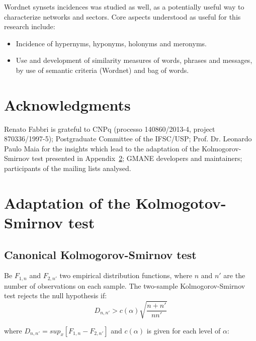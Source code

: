 \documentclass[%
 aip,
 jmp,%
 amsmath,amssymb,
 reprint,%
]{revtex4-1}
\begin{document}
Wordnet synsets incidences was studied as well, as a potentially useful way to characterize networks and sectors. Core aspects understood as useful for this research include:
\begin{itemize}
    \item Incidence of hypernyms, hyponyms, holonyms and meronyms.
    \item Use and development of similarity measures of words, phrases and messages, by use of semantic criteria (Wordnet) and bag of words.
\end{itemize}



\section{Acknowledgments}
Renato Fabbri is grateful to CNPq 
(processo 140860/2013-4, project 870336/1997-5);
Postgraduate Committee of the IFSC/USP;
Prof. Dr. Leonardo Paulo Maia for the insights
which lead to the adaptation of the Kolmogorov-Smirnov
test presented in Appendix~\ref{sec:ks}; GMANE
developers and maintainers; participants of the
mailing lists analysed.

%

%
%
\newpage
\appendix
\section{Adaptation of the Kolmogotov-Smirnov test}\label{sec:ks}
\subsection{Canonical Kolmogorov-Smirnov test}
Be $F_{1,n}$ and $F_{2,n'}$ two empirical distribution functions, where $n$ and $n'$ are the number of observations on each sample. The two-sample Kolmogorov-Smirnov test rejects the null hypothesis if:
\begin{equation}\label{eq:ks}
D_{n,n'} > c(\alpha)\sqrt{\frac{n+n'}{nn'}}
\end{equation}

where $D_{n,n'}=sup_x[F_{1,n}-F_{2,n'}]$ and $c(\alpha)$ is given for each level of $\alpha$:
\end{document}
